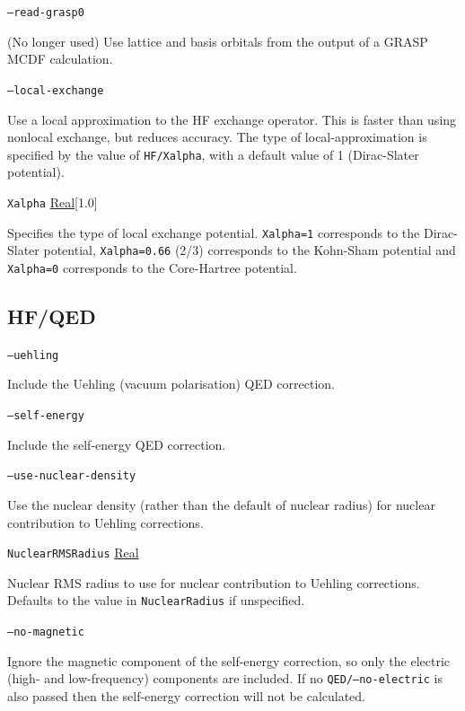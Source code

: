 \documentclass{report}
\begin{document}
\texttt{--read-grasp0}
\begin{adjustwidth}{1cm}{}
(No longer used) Use lattice and basis orbitals from the output of a GRASP MCDF calculation.
\end{adjustwidth}

\texttt{--local-exchange}
\begin{adjustwidth}{1cm}{}
Use a local approximation to the HF exchange operator. This is faster than using nonlocal exchange, but
reduces accuracy. The type of local-approximation is specified by the value of \texttt{HF/Xalpha}, with
a default value of 1 (Dirac-Slater potential).
\end{adjustwidth}

\texttt{Xalpha} \uline{Real}[1.0]
\begin{adjustwidth}{1cm}{}
Specifies the type of local exchange potential. \texttt{Xalpha=1} corresponds to the Dirac-Slater
potential, \texttt{Xalpha=0.66} (2/3) corresponds to the Kohn-Sham potential and \texttt{Xalpha=0}
corresponds to the Core-Hartree potential.
\end{adjustwidth}

\subsection{HF/QED}
\texttt{--uehling}
\begin{adjustwidth}{1cm}{}
Include the Uehling (vacuum polarisation) QED correction.
\end{adjustwidth}

\texttt{--self-energy}
\begin{adjustwidth}{1cm}{}
Include the self-energy QED correction.
\end{adjustwidth}

\texttt{--use-nuclear-density}
\begin{adjustwidth}{1cm}{}
Use the nuclear density (rather than the default of nuclear radius) for nuclear contribution to Uehling 
corrections.
\end{adjustwidth}

\texttt{NuclearRMSRadius} \uline{Real}
\begin{adjustwidth}{1cm}{}
Nuclear RMS radius to use for nuclear contribution to Uehling corrections. Defaults to the value in 
\texttt{NuclearRadius} if unspecified.
\end{adjustwidth}

\texttt{--no-magnetic}
\begin{adjustwidth}{1cm}{}
Ignore the magnetic component of the self-energy correction, so only the electric (high- and
low-frequency) components are included. If no \texttt{QED/--no-electric} is also passed then the self-energy
correction will not be calculated.
\end{adjustwidth}
\end{document}
